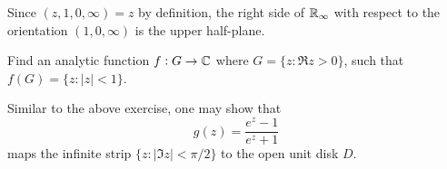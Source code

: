 	Since $(z,1,0,\infty) = z$ by definition, the right side of $\mathbb{R}_\infty$ with respect to the orientation $(1,0,\infty)$ is the upper half-plane.\\

	\begin{exercise}
		Find an analytic function $f : G \to \mathbb{C}$ where $G = \{ z : \Re z > 0 \}$, such that $f(G) = \{ z : |z| < 1 \}$.
	\end{exercise}

	Similar to the above exercise, one may show that
	\[ g(z) = \frac{e^z - 1}{e^z + 1} \]
	maps the infinite strip $\{ z : |\Im z| < \pi/2 \}$ to the open unit disk $D$.
